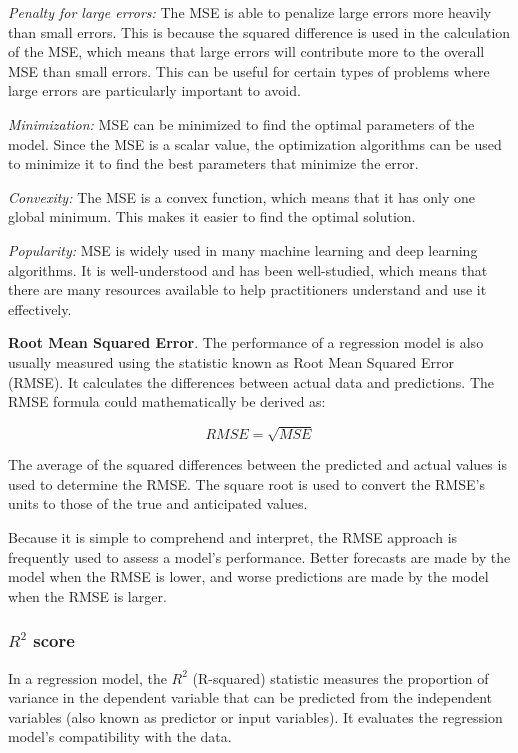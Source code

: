 \documentclass[a4paper]{article}
\begin{document}
\textit{Penalty for large errors:} The MSE is able to penalize large errors more heavily than small errors. This is because the squared difference is used in the calculation of the MSE, which means that large errors will contribute more to the overall MSE than small errors. This can be useful for certain types of problems where large errors are particularly important to avoid.

\textit{Minimization: }MSE can be minimized to find the optimal parameters of the model. Since the MSE is a scalar value, the optimization algorithms can be used to minimize it to find the best parameters that minimize the error.

\textit{Convexity:} The MSE is a convex function, which means that it has only one global minimum. This makes it easier to find the optimal solution.

\textit{Popularity:} MSE is widely used in many machine learning and deep learning algorithms. It is well-understood and has been well-studied, which means that there are many resources available to help practitioners understand and use it effectively.

\textbf{Root Mean Squared Error}. 
The performance of a regression model is also usually measured using the statistic known as Root Mean Squared Error (RMSE). It calculates the differences between actual data and predictions. The RMSE formula could mathematically be derived as:

$$
RMSE = \sqrt{MSE}
$$

The average of the squared differences between the predicted and actual values is used to determine the RMSE. The square root is used to convert the RMSE's units to those of the true and anticipated values.

Because it is simple to comprehend and interpret, the RMSE approach is frequently used to assess a model's performance. Better forecasts are made by the model when the RMSE is lower, and worse predictions are made by the model when the RMSE is larger. 
\subsubsection{$R^2$ score}
In a regression model, the $R^2$ (R-squared) statistic measures the proportion of variance in the dependent variable that can be predicted from the independent variables (also known as predictor or input variables). It evaluates the regression model's compatibility with the data.
\end{document}
